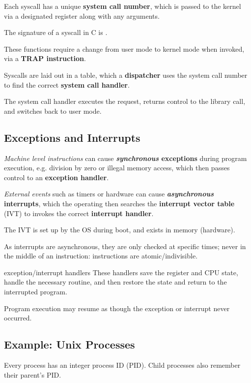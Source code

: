 Each syscall has a unique \textbf{system call number}, which is passed to the kernel via a designated register along with any arguments.

The signature of a syscall in C is .

These functions require a change from user mode to kernel mode when invoked, via a \textbf{TRAP instruction}.

Syscalls are laid out in a table, which a \textbf{dispatcher} uses the system call number to find the correct \textbf{system call handler}.

The system call handler executes the request, returns control to the library call, and switches back to user mode.

\subsection{Exceptions and Interrupts}
\textit{Machine level instructions} can cause \textbf{\textit{synchronous} exceptions} during program execution, e.g. division by zero or illegal memory access, which then passes control to an \textbf{exception handler}.

\textit{External events} such as timers or hardware can cause \textbf{\textit{asynchronous} interrupts}, which the operating then searches the \textbf{interrupt vector table} (IVT) to invokes the correct \textbf{interrupt handler}.

The IVT is set up by the OS during boot, and exists in memory (hardware).

As interrupts are asynchronous, they are only checked at specific times; never in the middle of an instruction: instructions are atomic/indivisible.

\begin{defn}{exception/interrupt handlers}
    These handlers save the register and CPU state, handle the necessary routine, and then restore the state and return to the interrupted program.

    Program execution may resume as though the exception or interrupt never occurred.
\end{defn}

\subsection{Example: Unix Processes}
Every process has an integer process ID (PID).
Child processes also remember their parent's PID.


